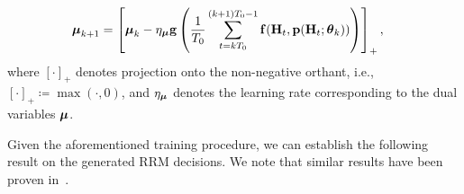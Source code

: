 \documentclass[lettersize,journal]{IEEEtran}
\begin{document}
\begin{align}
\boldsymbol{\mu}_{k+1} &= \left[\boldsymbol{\mu}_k - \eta_{\boldsymbol{\mu}} {\mathbf g}\left( \frac{1}{T_0} \sum_{t=kT_0}^{(k+1)T_0-1} {\mathbf f}({\mathbf H}_{t}, {\mathbf p}({\mathbf H}_{t};\boldsymbol{\theta}_k)) \right)\right]_+,\label{eq:mu_dynamics}
\end{align}
where $[\cdot]_+$ denotes projection onto the non-negative orthant, i.e., $[\cdot]_+ \coloneqq \max(\cdot, 0)$, and $\eta_{\boldsymbol{\mu}}$ denotes the learning rate corresponding to the dual variables $\boldsymbol{\mu}$.

Given the aforementioned training procedure, we can establish the following result on the generated RRM decisions. We note that similar results have been proven in~\cite{ribeiro2010ergodic, calvo2021state}.

\end{document}

